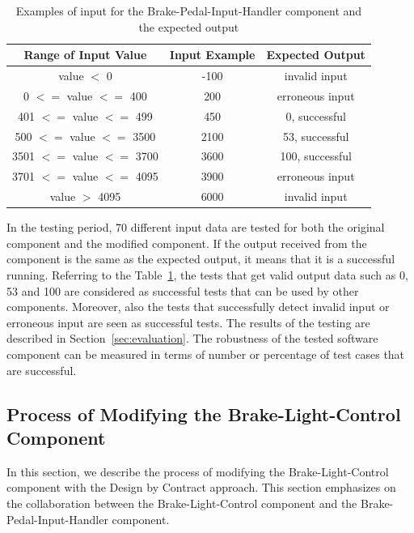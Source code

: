 \begin{table}[htb]
\centering
\begin{tabular}{|c|c|c|}\hline
Range of Input Value & Input Example & Expected Output \\ \hline
value $<$ 0 & -100 & invalid input\\ \hline
0 $<=$ value $<=$ 400 & 200 & erroneous input\\ \hline
401 $<=$ value $<=$ 499 & 450 & 0, successful\\ \hline
500 $<=$ value $<=$ 3500 & 2100 & 53, successful\\ \hline
3501 $<=$ value $<=$ 3700 & 3600 & 100, successful\\ \hline
3701 $<=$ value $<=$ 4095 & 3900 & erroneous input\\ \hline
value $>$ 4095 & 6000 & invalid input\\ \hline
\end{tabular}
\caption{Examples of input for the Brake-Pedal-Input-Handler component and the expected output}
\label{tab:BPIHExpectedOutput}
\vspace{-.4cm}
\end{table}


In the testing period, 70 different input data are tested for both the original component and the modified component. If the output received from the component is the same as the expected output, it means that it is a successful running. Referring to the Table~\ref{tab:BPIHExpectedOutput}, the tests that get valid output data such as 0, 53 and 100 are considered as successful tests that can be used by other components. Moreover, also 
the tests that successfully detect invalid input or erroneous input are seen as successful tests. The results of the testing are described in Section~\ref{sec:evaluation}. The robustness of the tested software component can be measured in terms of number or percentage of  %
 test cases that are successful.

\subsection{Process of Modifying the Brake-Light-Control Component}

In this section, we describe the process of modifying the Brake-Light-Control component with the Design by Contract approach. This section emphasizes on the collaboration between the Brake-Light-Control component and the Brake-Pedal-Input-Handler component.

